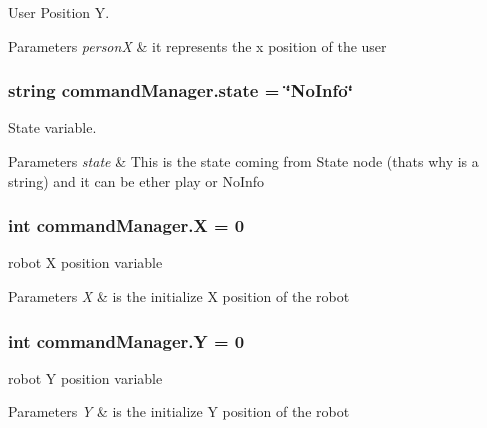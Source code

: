 User Position Y. 


\begin{DoxyParams}{Parameters}
{\em personX} & it represents the x position of the user \\
\hline
\end{DoxyParams}
\subsubsection[{\texorpdfstring{state}{state}}]{\setlength{\rightskip}{0pt plus 5cm}string command\+Manager.\+state = \char`\"{}No\+Info\char`\"{}}\hypertarget{namespacecommandManager_ad20ad550a7350517b8e1ce3dc95e3347}{}\label{namespacecommandManager_ad20ad550a7350517b8e1ce3dc95e3347}


State variable. 


\begin{DoxyParams}{Parameters}
{\em state} & This is the state coming from State node (that\textquotesingle{}s why is a string) and it can be ether play or No\+Info \\
\hline
\end{DoxyParams}
\subsubsection[{\texorpdfstring{X}{X}}]{\setlength{\rightskip}{0pt plus 5cm}int command\+Manager.\+X = 0}\hypertarget{namespacecommandManager_af232742df3203418fc63619d6fdbbd7d}{}\label{namespacecommandManager_af232742df3203418fc63619d6fdbbd7d}


robot X position variable 


\begin{DoxyParams}{Parameters}
{\em X} & is the initialize X position of the robot \\
\hline
\end{DoxyParams}
\subsubsection[{\texorpdfstring{Y}{Y}}]{\setlength{\rightskip}{0pt plus 5cm}int command\+Manager.\+Y = 0}\hypertarget{namespacecommandManager_a724d5ba6dbd057b575e254a1abbb8b63}{}\label{namespacecommandManager_a724d5ba6dbd057b575e254a1abbb8b63}


robot Y position variable 


\begin{DoxyParams}{Parameters}
{\em Y} & is the initialize Y position of the robot \\
\hline
\end{DoxyParams}
